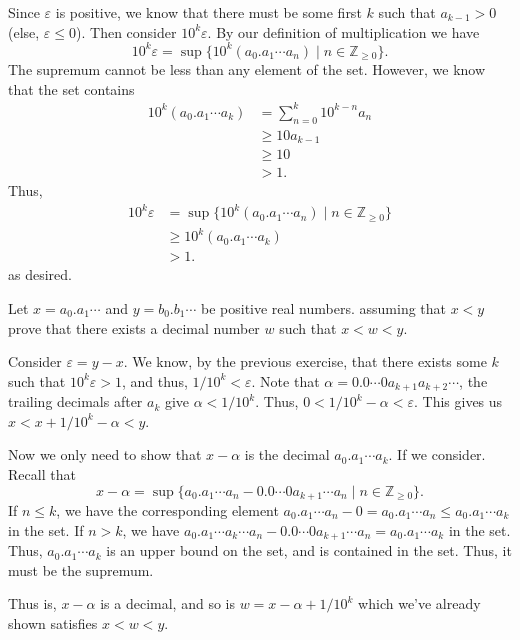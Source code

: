 \documentclass[12 pt, letterpaper]{hmcpset}
\begin{document}
\begin{solution}
	Since $\varepsilon$ is positive, we know that there must be some first $k$ such that $a_{k - 1} > 0$ (else, $\varepsilon \le 0$). Then consider $10^{k} \varepsilon$. By our definition of multiplication we have
	\[
		10^{k} \varepsilon = \sup \{ 10^{k} (a_{0}.a_{1} \cdots a_{n}) \mid n \in \mathbb{Z}_{\ge 0} \}.
	\]
	The supremum cannot be less than any element of the set. However, we know that the set contains
	\[
		\begin{split}
			10^{k} (a_{0}.a_{1} \cdots a_{k}) & = \sum_{n = 0}^{k} 10^{k - n} a_{n} \\
							  & \ge 10 a_{k - 1} \\
							  & \ge 10 \\
							  & > 1.
		\end{split}
	\]
	Thus,
	\[
		\begin{split}
			10^{k} \varepsilon & = \sup \{ 10^{k}(a_{0}.a_{1} \cdots a_{n}) \mid n \in \mathbb{Z}_{\ge 0} \} \\
					   & \ge 10^{k} (a_{0}.a_{1} \cdots a_{k}) \\
					   & > 1.
		\end{split}
	\]
	as desired.
\end{solution}

\pagebreak

\begin{problem}[5.]
	Let $x = a_{0}.a_{1} \cdots$ and $y = b_{0}.b_{1} \cdots$ be positive real numbers. assuming that $x < y$ prove that there exists a decimal number $w$ such that $x < w < y$.
\end{problem}

\begin{solution}
	Consider $\varepsilon = y - x$. We know, by the previous exercise, that there exists some $k$ such that $10^{k} \varepsilon > 1$, and thus, $1/10^{k} < \varepsilon$. Note that $\alpha = 0.0 \cdots 0 a_{k + 1} a_{k + 2} \cdots$, the trailing decimals after $a_{k}$ give $\alpha < 1/10^{k}$. Thus, $0 < 1/10^{k} - \alpha < \varepsilon$. This gives us $x < x + 1/10^{k} - \alpha < y$.

	Now we only need to show that $x - \alpha$ is the decimal $a_{0}.a_{1} \cdots a_{k}$. If we consider. Recall that
	\[
		x - \alpha = \sup \{ a_{0}.a_{1} \cdots a_{n} - 0.0 \cdots 0 a_{k + 1} \cdots a_{n} \mid n \in \mathbb{Z}_{\ge 0} \}.
	\]
	If $n \le k$, we have the corresponding element $a_{0}.a_{1} \cdots a_{n} - 0 = a_{0}.a_{1} \cdots a_{n} \le a_{0}.a_{1} \cdots a_{k}$ in the set. If $n > k$, we have $a_{0}.a_{1} \cdots a_{k} \cdots a_{n} - 0.0 \cdots 0 a_{k + 1} \cdots a_{n} = a_{0}.a_{1} \cdots a_{k}$ in the set. Thus, $a_{0}.a_{1} \cdots a_{k}$ is an upper bound on the set, and is contained in the set. Thus, it must be the supremum. 

	Thus is, $x -  \alpha$ is a decimal, and so is $w = x - \alpha + 1/10^{k}$ which we've already shown satisfies $x < w < y$.
\end{solution}
\end{document}
